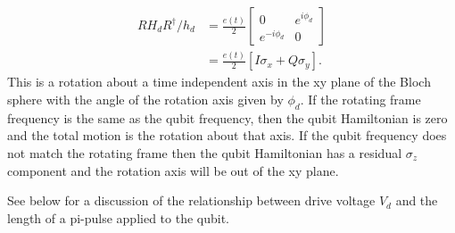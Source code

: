 \begin{align}
  RH_dR^{\dagger}/h_d
  &= \frac{e(t)}{2}
  \left[ \begin{array}{cc}
    0 & e^{i\phi_d} \\ e^{-i\phi_d} & 0
  \end{array} \right] \nonumber \\
  &= \frac{e(t)}{2} \left[ I \sigma_x + Q \sigma_y \right] .
\end{align}
This is a rotation about a time independent axis in the xy plane of the Bloch sphere with the angle of the rotation axis given by $\phi_d$.
If the rotating frame frequency is the same as the qubit frequency, then the qubit Hamiltonian is zero and the total motion is the rotation about that axis.
If the qubit frequency does not match the rotating frame then the qubit Hamiltonian has a residual $\sigma_z$ component and the rotation axis will be out of the xy plane.

See below for a discussion of the relationship between drive voltage $V_d$ and the length of a pi-pulse applied to the qubit.


